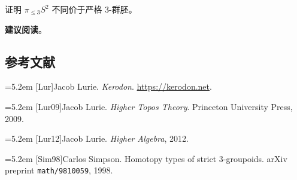 \begin{exercise}\label{L1-A.3}
证明 $\pi_{\le 3}S^2$ 不同价于严格 $3$-群胚。
\end{exercise}

\nitem\label{L1-A.4} \textbf{建议阅读}\quad [Sim98]。

\subsection*{参考文献}
\par\noindent\hangindent=5.2em [Lur]\hspace{0.6em}Jacob Lurie. \emph{Kerodon}. \url{https://kerodon.net}.
\par\noindent\hangindent=5.2em [Lur09]\hspace{0.6em}Jacob Lurie. \emph{Higher Topos Theory}. Princeton University Press, 2009.
\par\noindent\hangindent=5.2em [Lur12]\hspace{0.6em}Jacob Lurie. \emph{Higher Algebra}, 2012.
\par\noindent\hangindent=5.2em [Sim98]\hspace{0.6em}Carlos Simpson. Homotopy types of strict 3-groupoids. arXiv preprint \texttt{math/9810059}, 1998.
